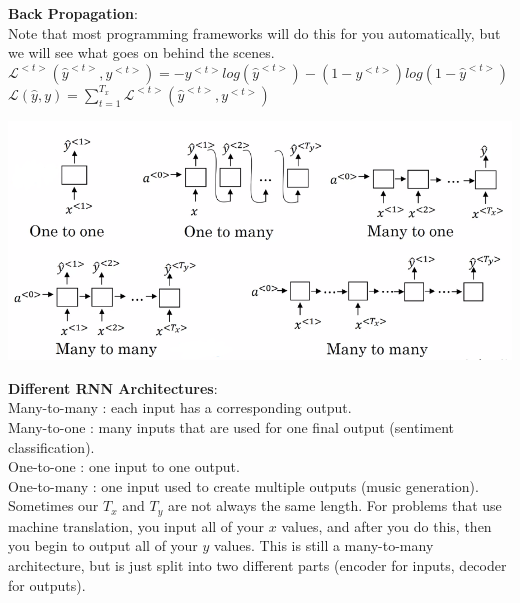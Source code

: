 \documentclass[11pt, a4paper]{article}
\begin{document}
\begin{spacing}{1.1}
	\noindent \textbf{Back Propagation}: \\
	Note that most programming frameworks will do this for you automatically, but we will see what goes on behind the scenes. \vspace*{1.5mm}\\
	$\mathcal{L}^{<t>} (\hat{y}^{<t>}, y^{<t>}) = -y^{<t>}log(\hat{y}^{<t>}) - (1-y^{<t>})log(1-\hat{y}^{<t>})$ \vspace*{1mm}\\
	$\mathcal{L}(\hat{y},y) = \sum_{t=1}^{T_x} \mathcal{L}^{<t>} (\hat{y}^{<t>}, y^{<t>})$ \\
	\begin{center}
	\includegraphics[scale=.5]{rnn_models}
	\end{center}	
	\textbf{Different RNN Architectures}: \\
	Many-to-many : each input has a corresponding output. \\
	Many-to-one : many inputs that are used for one final output (sentiment classification). \\
	One-to-one : one input to one output. \\
	One-to-many : one input used to create multiple outputs (music generation). \vspace*{2mm}\\
	Sometimes our $T_x$ and $T_y$ are not always the same length. For problems that use machine translation, you input all of your $x$ values, and after you do this, then you begin to output all of your $y$ values. This is still a many-to-many architecture, but is just split into two different parts (encoder for inputs, decoder for  outputs). \\
	

\end{spacing}
\end{document}
